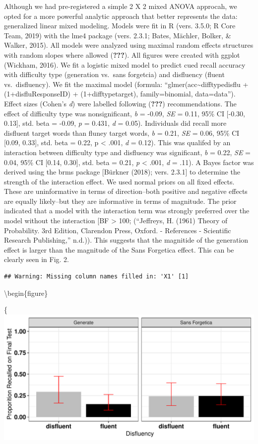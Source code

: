 \documentclass[english,pdf]{apa6}
\begin{document}
Although we had pre-registered a simple 2 X 2 mixed ANOVA approcah, we opted for a more powerful analytic approach that better represents the data: generalized linear mixed modeling. Models were fit in R (vers. 3.5.0; R Core Team, 2019) with the lme4 package (vers. 2.3.1; Bates, Mächler, Bolker, \& Walker, 2015). All models were analyzed using maximal random effects structures with random slopes where allowed ({\textbf{???}}). All figures were created with ggplot (Wickham, 2016). We fit a logistic mixed model to predict cued recall accuracy with difficulty type (generation vs.~sans forgetcia) and disfluency (fluent vs.~disfluency). We fit the maximal model (formula: \enquote{glmer(acc\textasciitilde{}difftypedisflu + (1+disflu\textbar{}ResponseID) + (1+difftype\textbar{}target), family=binomial, data=data}). Effect sizes (Cohen's \emph{d}) were labelled following ({\textbf{???}}) recommendations. The effect of difficulty type was nonsignificant, \emph{b} = -0.09, \emph{SE} = 0.11, 95\% CI {[}-0.30, 0.13{]}, std. beta = -0.09, \emph{p} = 0.431, \emph{d} = 0.05). Individuals did recall more disfluent target words than fluney target words, \emph{b} = 0.21, \emph{SE} = 0.06, 95\% CI {[}0.09, 0.33{]}, std. beta = 0.22, p \textless{} .001, \emph{d} = 0.12). This was qualifed by an interaction between difficulty type and disfluency was significant, \emph{b} = 0.22, \emph{SE} = 0.04, 95\% CI {[}0.14, 0.30{]}, std. beta = 0.21, \emph{p} \textless{} .001, \emph{d} = .11). A Bayes factor was derived using the brms package {[}Bürkner (2018); vers. 2.3.1{]} to determine the strength of the interaction effect. We used normal priors on all fixed effects. These are uninformative in terms of direction--both positive and negative effects are equally likely--but they are informative in terms of magnitude. The prior indicated that a model with the interaction term was strongly preferred over the model without the interaction {[}BF \textgreater{} 100; (``Jeffreys, H. (1961) Theory of Probability. 3rd Edition, Clarendon Press, Oxford. - References - Scientific Research Publishing,'' n.d.)). This suggests that the magnitide of the generation effect is larger than the magnitude of the Sans Forgetica effect. This can be clearly seen in Fig. 2.

\begin{verbatim}
## Warning: Missing column names filled in: 'X1' [1]
\end{verbatim}

\textbackslash{}begin\{figure\}

\{\centering \includegraphics{SF_Paper_files/figure-latex/unnamed-chunk-2-1}
\end{document}
